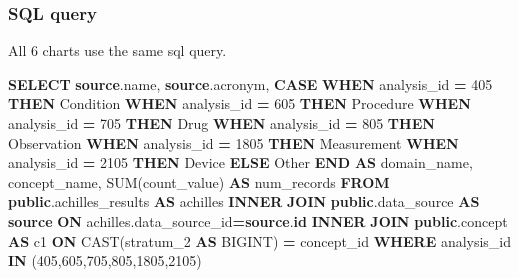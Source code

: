\documentclass[
]{book}
\newenvironment{Shaded}{\begin{snugshade}}{\end{snugshade}}
\newcommand{\ControlFlowTok}[1]{\textcolor[rgb]{0.13,0.29,0.53}{\textbf{#1}}}
\newcommand{\DecValTok}[1]{\textcolor[rgb]{0.00,0.00,0.81}{#1}}
\newcommand{\FunctionTok}[1]{\textcolor[rgb]{0.00,0.00,0.00}{#1}}
\newcommand{\KeywordTok}[1]{\textcolor[rgb]{0.13,0.29,0.53}{\textbf{#1}}}
\newcommand{\NormalTok}[1]{#1}
\newcommand{\OperatorTok}[1]{\textcolor[rgb]{0.81,0.36,0.00}{\textbf{#1}}}
\newcommand{\StringTok}[1]{\textcolor[rgb]{0.31,0.60,0.02}{#1}}
\begin{document}
\hypertarget{sql-query-24}{%
\subsubsection*{SQL query}\label{sql-query-24}}

All 6 charts use the same sql query.

\begin{Shaded}
\begin{Highlighting}[]
\KeywordTok{SELECT} \KeywordTok{source}\NormalTok{.name,}
    \KeywordTok{source}\NormalTok{.acronym,}
    \ControlFlowTok{CASE} \ControlFlowTok{WHEN}\NormalTok{ analysis\_id }\OperatorTok{=} \DecValTok{405} \ControlFlowTok{THEN} \StringTok{\textquotesingle{}Condition\textquotesingle{}}
    \ControlFlowTok{WHEN}\NormalTok{ analysis\_id }\OperatorTok{=} \DecValTok{605} \ControlFlowTok{THEN} \StringTok{\textquotesingle{}Procedure\textquotesingle{}}
    \ControlFlowTok{WHEN}\NormalTok{ analysis\_id }\OperatorTok{=} \DecValTok{705} \ControlFlowTok{THEN} \StringTok{\textquotesingle{}Drug\textquotesingle{}}
    \ControlFlowTok{WHEN}\NormalTok{ analysis\_id }\OperatorTok{=} \DecValTok{805} \ControlFlowTok{THEN} \StringTok{\textquotesingle{}Observation\textquotesingle{}}
    \ControlFlowTok{WHEN}\NormalTok{ analysis\_id }\OperatorTok{=} \DecValTok{1805} \ControlFlowTok{THEN} \StringTok{\textquotesingle{}Measurement\textquotesingle{}}
    \ControlFlowTok{WHEN}\NormalTok{ analysis\_id }\OperatorTok{=} \DecValTok{2105} \ControlFlowTok{THEN} \StringTok{\textquotesingle{}Device\textquotesingle{}}
    \ControlFlowTok{ELSE} \StringTok{\textquotesingle{}Other\textquotesingle{}} \ControlFlowTok{END} \KeywordTok{AS}\NormalTok{ domain\_name,}
\NormalTok{    concept\_name,}
    \FunctionTok{SUM}\NormalTok{(count\_value) }\KeywordTok{AS}\NormalTok{ num\_records}
\KeywordTok{FROM} \KeywordTok{public}\NormalTok{.achilles\_results }\KeywordTok{AS}\NormalTok{ achilles}
\KeywordTok{INNER} \KeywordTok{JOIN} \KeywordTok{public}\NormalTok{.data\_source }\KeywordTok{AS} \KeywordTok{source} \KeywordTok{ON}\NormalTok{ achilles.data\_source\_id}\OperatorTok{=}\KeywordTok{source}\NormalTok{.}\KeywordTok{id}
\KeywordTok{INNER} \KeywordTok{JOIN} \KeywordTok{public}\NormalTok{.concept }\KeywordTok{AS}\NormalTok{ c1 }\KeywordTok{ON} \FunctionTok{CAST}\NormalTok{(stratum\_2 }\KeywordTok{AS}\NormalTok{ BIGINT) }\OperatorTok{=}\NormalTok{ concept\_id}
\KeywordTok{WHERE}\NormalTok{ analysis\_id }\KeywordTok{IN}\NormalTok{ (}\DecValTok{405}\NormalTok{,}\DecValTok{605}\NormalTok{,}\DecValTok{705}\NormalTok{,}\DecValTok{805}\NormalTok{,}\DecValTok{1805}\NormalTok{,}\DecValTok{2105}\NormalTok{)}

\end{Highlighting}
\end{Shaded}
\end{document}
